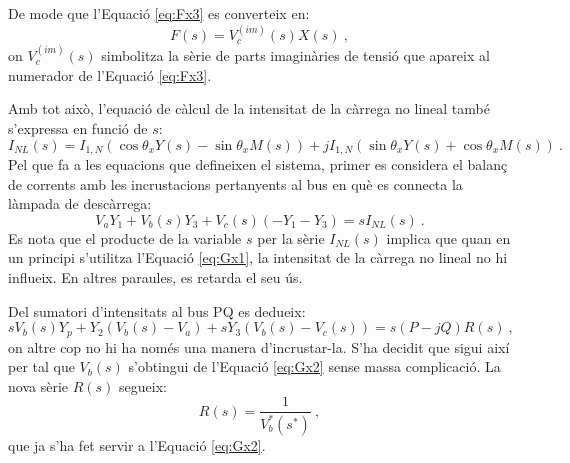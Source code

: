 De mode que l'Equació \ref{eq:Fx3} es converteix en:
\begin{equation}
F(s)=V_c^{(im)}(s)X(s)\ ,
\label{eq:Fx9}
\end{equation}
on $V_c^{(im)}(s)$ simbolitza la sèrie de parts imaginàries de tensió que apareix al numerador de l'Equació \ref{eq:Fx3}.

Amb tot això, l'equació de càlcul de la intensitat de la càrrega no lineal també s'expressa en funció de $s$:
\begin{equation}
I_{NL}(s)=I_{1,N}(\cos\theta_xY(s)-\sin\theta_xM(s))+jI_{1,N}(\sin\theta_xY(s)+\cos\theta_xM(s))\ .
\label{eq:Fx10}
\end{equation}
Pel que fa a les equacions que defineixen el sistema, primer es considera el balanç de corrents amb les incrustacions pertanyents al bus en què es connecta la làmpada de descàrrega:
\begin{equation}
    V_aY_1+V_b(s)Y_3+V_c(s)(-Y_1-Y_3)=sI_{NL}(s)\ .
    \label{eq:Gx1}
\end{equation}
Es nota que el producte de la variable $s$ per la sèrie $I_{NL}(s)$ implica que quan en un principi s'utilitza l'Equació \ref{eq:Gx1}, la intensitat de la càrrega no lineal no hi influeix. En altres paraules, es retarda el seu ús.

Del sumatori d'intensitats al bus PQ es dedueix:
\begin{equation}
sV_b(s)Y_p+Y_2(V_b(s)-V_a)+sY_3(V_b(s)-V_c(s))=s(P-jQ)R(s)\ ,
\label{eq:Gx2}
\end{equation}
on altre cop no hi ha només una manera d'incrustar-la. S'ha decidit que sigui així per tal que $V_b(s)$ s'obtingui de l'Equació \ref{eq:Gx2} sense massa complicació. La nova sèrie $R(s)$ segueix:
\begin{equation}
    R(s)=\frac{1}{V^*_b(s^*)}\ ,
    \label{eq:Gx3}
\end{equation}
que ja s'ha fet servir a l'Equació \ref{eq:Gx2}. 

